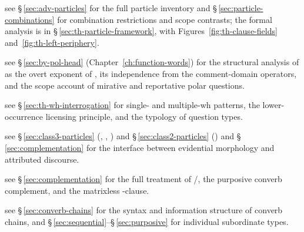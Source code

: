 \begin{description}[leftmargin=2em, labelwidth=!, labelindent=0em]
\item[\upshape Left-periphery structure (§\,\ref{sec:th-left-periphery}):] see
	§\,\ref{sec:adv-particles} for the full particle inventory and
	§\,\ref{sec:particle-combinations} for combination restrictions and
	scope contrasts; the formal analysis is in
	§\,\ref{sec:th-particle-framework}, with Figures~\ref{fig:th-clause-fields}
	and~\ref{fig:th-left-periphery}.
\item[\upshape Polar questions (§\,\ref{sec:th-polar-questions}):] see
	§\,\ref{sec:by-pol-head} (Chapter~\ref{ch:function-words}) for the
	structural analysis of  as the overt exponent of
	, its independence from the
	comment-domain operators, and the scope account of mirative and
	reportative polar questions.
\item[\upshape \textit{Wh}-interrogation (§\,\ref{sec:th-wh-interrogation}):] see
	§\,\ref{sec:th-wh-interrogation} for single- and multiple-wh patterns, the
	lower-occurrence licensing principle, and the typology of question types.
\item[\upshape Evidential particles (§\,\ref{sec:class3-particles}):] see
	§\,\ref{sec:class3-particles} (, , )
	and §\,\ref{sec:class2-particles} () and §\,\ref{sec:complementation} for the interface between
	evidential morphology and attributed discourse.
\item[\upshape Complementation (§\,\ref{sec:complementation}):] see
	§\,\ref{sec:complementation} for the full treatment of /,
	the purposive converb complement, and the matrixless -clause.
\item[\upshape Head-finality and subordination (§\,\ref{sec:th-subord-headfinal}):] see
	§\,\ref{sec:converb-chains} for the syntax and information structure of
	converb chains, and §\,\ref{sec:sequential}--§\,\ref{sec:purposive} for
	individual subordinate types.
\end{description}
